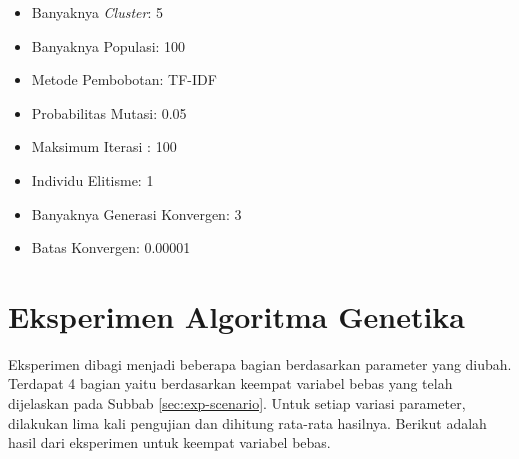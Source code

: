 \begin{itemize}
    \item Banyaknya \textit{Cluster}: 5
    \item Banyaknya Populasi: 100
    \item Metode Pembobotan: TF-IDF
    \item Probabilitas Mutasi: 0.05
    \item Maksimum Iterasi : 100
    \item Individu Elitisme: 1
    \item Banyaknya Generasi Konvergen: 3
	\item Batas Konvergen: 0.00001
\end{itemize}

\section{Eksperimen Algoritma Genetika}
\label{sec:experiment-ga}
Eksperimen dibagi menjadi beberapa bagian berdasarkan parameter yang diubah. Terdapat 4 bagian yaitu berdasarkan keempat variabel bebas yang telah dijelaskan pada Subbab \ref{sec:exp-scenario}. Untuk setiap variasi parameter, dilakukan lima kali pengujian dan dihitung rata-rata hasilnya. Berikut adalah hasil dari eksperimen untuk keempat variabel bebas.

